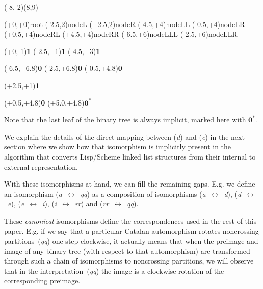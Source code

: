 \documentclass[11pt]{article} %
\newcommand{\catint}[1]{({\it #1})}
\def\catintbij#1#2{({\it #1}~$\leftrightarrow$~{\it #2})}
\begin{document}
\begin{center}
\pspicture*(-8,-2)(8,9)

     \dotnode(+0,+0){root}
     \dotnode(-2.5,2){nodeL}
     \dotnode(+2.5,2){nodeR}
     \dotnode(-4.5,+4){nodeLL}
     \dotnode(-0.5,+4){nodeLR}
     \dotnode(+0.5,+4){nodeRL}
     \dotnode(+4.5,+4){nodeRR}
     \dotnode(-6.5,+6){nodeLLL}
     \dotnode(-2.5,+6){nodeLLR}


     (+0,-1){{\bf 1}} %
     (-2.5,+1){{\bf 1}} %
     (-4.5,+3){{\bf 1}} %

     (-6.5,+6.8){{\bf 0}} %
     (-2.5,+6.8){{\bf 0}} %
     (-0.5,+4.8){{\bf 0}} %

     (+2.5,+1){{\bf 1}} %

     (+0.5,+4.8){{\bf 0}} %
     (+5.0,+4.8){${\mathbf 0^*}$} %


\endpspicture
\end{center}
Note that the last leaf of the binary tree is always implicit, marked here with
{${\mathbf 0^*}$}.

We explain the details of the direct mapping between \catint{d} and \catint{e}
in the next section where we
show how that isomorphism is implicitly present in the algorithm
that converts Lisp/Scheme linked list structures from their internal
to external representation.

With these isomorphisms at hand, we can fill the remaining
gaps. E.g. we define an isomorphism \catintbij{a}{qq}
as a composition of isomorphisms  \catintbij{a}{d}, \catintbij{d}{e},
\catintbij{e}{i}, \catintbij{i}{rr} and \catintbij{rr}{qq}.

These {\em canonical} isomorphisms define the correspondences used in
the rest of this paper. E.g. if we say that a particular
Catalan automorphism rotates noncrossing partitions~\catint{qq} one step
clockwise, it actually means that when the preimage and image
of any binary tree (with respect to that automorphism) are transformed
through such a chain of isomorphisms to noncrossing partitions,
we will observe that in the interpretation~\catint{qq} the image
is a clockwise rotation of the corresponding preimage.
\end{document}
